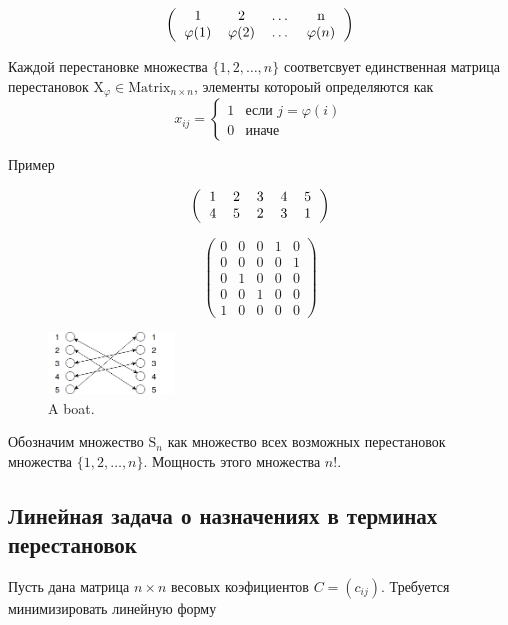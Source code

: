 \[
\left (
  \begin{tabular}{cccc}
  1 & 2 & \ldots & n\\
  $\varphi (1)$ & $\varphi (2)$ & \ldots & $\varphi (n)$
  \end{tabular}
\right )
\]



Каждой перестановке множества $\{1, 2, \ldots , n \}$ соответсвует единственная матрица
перестановок $\mathrm{X}_\varphi \in \mathrm{Matrix}_{n \times n}$, элементы котороый определяются как
\[
x_{ij} =
 \begin{cases}
   1 & \text{если } j = \varphi(i) \\
   0 & \text{иначе}
 \end{cases}
\]

Пример

\[
\left (
  \begin{tabular}{ccccc}
  1 & 2 & 3 & 4 & 5\\
  4 & 5 & 2 & 3 & 1
  \end{tabular}
\right )
\]


\[ \left(
\begin{matrix}
 0 & 0 & 0 & 1 & 0 \\
 0 & 0 & 0 & 0 & 1 \\
 0 & 1 & 0 & 0 & 0 \\
 0 & 0 & 1 & 0 & 0 \\
 1 & 0 & 0 & 0 & 0
\end{matrix} \right)
\]

\begin{figure}[h!]
  \includegraphics[width=0.3\textwidth]{Chapters/image/premutation.png}
  \caption{A boat.}
  \label{fig:flowchart}
\end{figure}


Обозначим множество $\mathrm{S}_n$ как множество всех возможных перестановок множества
 $\{1, 2, \ldots , n \}$. Мощность этого множества $n!$.

\subsection{Линейная задача о назначениях в терминах перестановок}
Пусть дана матрица $n \times n$ весовых коэфициентов $C = (c_{ij})$.
Требуется минимизировать линейную форму

